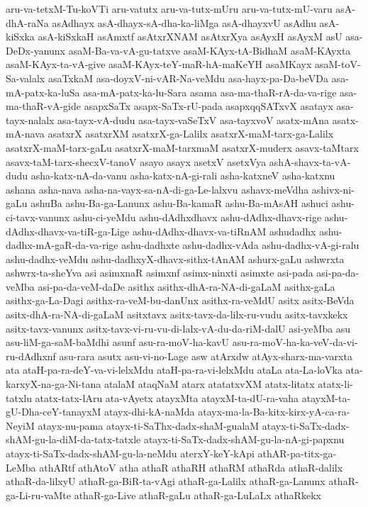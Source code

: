 {aru-va-tetxM-Tu-koVTi
aru-vatutx
aru-va-tutx-mUru
aru-va-tutx-mU-varu
asA-dhA-raNa
asAdhayx
asA-dhayx-sA-dha-ka-liMga
asA-dhayxvU
asAdhu
asA-kiSxka
asA-kiSxkaH
asAmxtf
asAtxrXNAM
asAtxrXya
asAyxH
asAyxM
asU
asa-DeDx-yanunx
asaM-Ba-va-vA-gu-tatxve
asaM-KAyx-tA-BidhaM
asaM-KAyxta
asaM-KAyx-ta-vA-give
asaM-KAyx-teY-maR-hA-maKeYH
asaMKayx
asaM-toV-Sa-valalx
asaTxkaM
asa-doyxV-ni-vAR-Na-veMdu
asa-hayx-pa-Da-beVDa
asa-mA-patx-ka-luSa
asa-mA-patx-ka-lu-Sara
asama
asa-ma-thaR-rA-da-va-rige
asa-ma-thaR-vA-gide
asapxSaTx
asapx-SaTx-rU-pada
asapxqqSATxvX
asatayx
asa-tayx-nalalx
asa-tayx-vA-dudu
asa-tayx-vaSeTxV
asa-tayxvoV
asatx-mAna
asatx-mA-nava
asatxrX
asatxrXM
asatxrX-ga-Lalilx
asatxrX-maM-tarx-ga-Lalilx
asatxrX-maM-tarx-gaLu
asatxrX-maM-tarxmaM
asatxrX-muderx
asavx-taMtarx
asavx-taM-tarx-shecxV-tanoV
asayo
asayx
asetxV
asetxVya
ashA-shavx-ta-vA-dudu
asha-katx-nA-da-vanu
asha-katx-nA-gi-rali
asha-katxneV
asha-katxnu
ashana
asha-nava
asha-na-vayx-sa-nA-di-ga-Le-lalxvu
ashavx-meVdha
ashivx-ni-gaLu
ashuBa
ashu-Ba-ga-Lanunx
ashu-Ba-kamaR
ashu-Ba-mAsAH
ashuci
ashu-ci-tavx-vanunx
ashu-ci-yeMdu
ashu-dAdhxdhavx
ashu-dAdhx-dhavx-rige
ashu-dAdhx-dhavx-va-tiR-ga-Lige
ashu-dAdhx-dhavx-va-tiRnAM
ashudadhx
ashu-dadhx-mA-gaR-da-va-rige
ashu-dadhxte
ashu-dadhx-vAda
ashu-dadhx-vA-gi-ralu
ashu-dadhx-veMdu
ashu-dadhxyX-dhavx-sithx-tAnAM
ashurx-gaLu
ashwrxta
ashwrx-ta-sheYva
asi
asimxnaR
asimxnf
asimx-ninxti
asimxte
asi-pada
asi-pa-da-veMba
asi-pa-da-veM-daDe
asithx
asithx-dhA-ra-NA-di-gaLaM
asithx-gaLa
asithx-ga-La-Dagi
asithx-ra-veM-bu-danUnx
asithx-ra-veMdU
asitx
asitx-BeVda
asitx-dhA-ra-NA-di-gaLaM
asitxtavx
asitx-tavx-da-lilx-ru-vudu
asitx-tavxkekx
asitx-tavx-vanunx
asitx-tavx-vi-ru-vu-di-lalx-vA-du-da-riM-dalU
asi-yeMba
asu
asu-liM-ga-saM-baMdhi
asunf
asu-ra-moV-ha-kavU
asu-ra-moV-ha-ka-veV-da-vi-ru-dAdhxnf
asu-rara
asutx
asu-vi-no-Lage
asw
atArxdw
atAyx-sharx-ma-varxta
ata
ataH-pa-ra-deY-va-vi-lelxMdu
ataH-pa-ra-vi-lelxMdu
ataLa
ata-La-loVka
ata-karxyX-na-ga-Ni-tana
atalaM
ataqNaM
atarx
atatatxvXM
atatx-litatx
atatx-li-tatxlu
atatx-tatx-lAru
ata-vAyetx
atayxMta
atayxM-ta-dU-ra-vaha
atayxM-ta-gU-Dha-ceY-tanayxM
atayx-dhi-kA-naMda
atayx-ma-la-Ba-kitx-kirx-yA-ca-ra-NeyiM
atayx-nu-pama
atayx-ti-SaThx-dadx-shaM-gualaM
atayx-ti-SaTx-dadx-shAM-gu-la-diM-da-tatx-tatxle
atayx-ti-SaTx-dadx-shAM-gu-la-nA-gi-papxnu
atayx-ti-SaTx-dadx-shAM-gu-la-neMdu
aterxY-keY-kApi
athAR-pa-titx-ga-LeMba
athARtf
athAtoV
atha
athaR
athaRH
athaRM
athaRda
athaR-dalilx
athaR-da-lilxyU
athaR-ga-BiR-ta-vAgi
athaR-ga-Lalilx
athaR-ga-Lanunx
athaR-ga-Li-ru-vaMte
athaR-ga-Live
athaR-gaLu
athaR-ga-LuLaLx
athaRkekx
}
